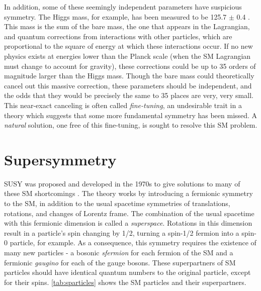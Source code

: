 In addition, some of these seemingly independent parameters have suspicious symmetry. The Higgs mass, for example, has been measured to be 125.7 $\pm$ 0.4 \gev \cite{Agashe:2014kda}. This mass is the sum of the bare mass, the one that appears in the Lagrangian, and quantum corrections from interactions with other particles, which are proportional to the square of energy at which these interactions occur. If no new physics exists at energies lower than the Planck scale (when the \ac{SM} Lagrangian must change to account for gravity), these corrections could be up to 35 orders of magnitude larger than the Higgs mass. Though the bare mass could theoretically cancel out this massive correction, these parameters should be independent, and the odds that they would be precisely the same to 35 places are very, very small. This near-exact canceling is often called \textit{fine-tuning}, an undesirable trait in a theory which suggests that some more fundamental symmetry has been missed. A \textit{natural} solution, one free of this fine-tuning, is sought to resolve this \ac{SM} problem. 


\section{Supersymmetry}

\acf{SUSY} was proposed and developed in the 1970s to give solutions to many of these \ac{SM} shortcomings \cite{WESS197439, 1971NuPhB..34..632G, 1971PhRvD...3.2415R}. The theory works by introducing a fermionic symmetry to the \ac{SM}, in addition to the usual spacetime symmetries of translations, rotations, and changes of Lorentz frame. The combination of the usual spacetime with this fermionic dimension is called a \textit{superspace}. Rotations in this dimension result in a particle's spin changing by 1/2, turning a spin-1/2 fermion into a spin-0 particle, for example. As a consequence, this symmetry requires the existence of many new particles - a bosonic \textit{sfermion} for each fermion of the \ac{SM} and a fermionic \textit{gaugino} for each of the gauge bosons. These superpartners of \ac{SM} particles should have identical quantum numbers to the original particle, except for their spins. \autoref{tab:sparticles} shows the \ac{SM} particles and their superpartners. 


